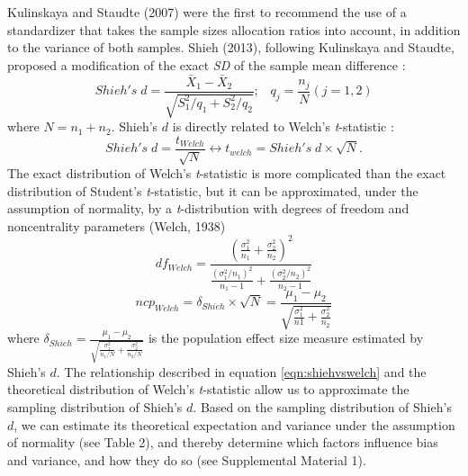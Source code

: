 \documentclass[
  english,
  man,floatsintext]{apa6}
\begin{document}
Kulinskaya and Staudte (2007) were the first to recommend the use of a standardizer that takes the sample sizes allocation ratios into account, in addition to the variance of both samples. Shieh (2013), following Kulinskaya and Staudte, proposed a modification of the exact \emph{SD} of the sample mean difference :
\begin{equation*} 
Shieh's \; d = \frac{\bar{X}_1 - \bar{X}_2}{\sqrt{S_1^2/q_1+S_2^2/q_2}}; \;\;\; q_j=\frac{n_j}{N} (j=1,2)
\label{eqn:Shiehds}
\end{equation*}
where \(N = n_1+n_2\). Shieh's \(d\) is directly related to Welch's \emph{t}-statistic :
\begin{equation} 
Shieh's \; d=\frac{t_{Welch}}{\sqrt{N}}\leftrightarrow t_{welch} = Shieh's \; d \times \sqrt{N}.
\label{eqn:shiehvswelch}
\end{equation}
The exact distribution of Welch's \emph{t}-statistic is more complicated than the exact distribution of Student's \emph{t}-statistic, but it can be approximated, under the assumption of normality, by a \emph{t}-distribution with degrees of freedom and noncentrality parameters (Welch, 1938)
\begin{equation} 
df_{Welch} = \frac{\left(\frac{\sigma^2_1}{n_1}+\frac{\sigma^2_2}{n_2} \right)^2}{\frac{(\sigma^2_1/n_1)^2}{n_1-1}+\frac{(\sigma^2_2/n_2)^2}{n_2-1}}
\label{eqn:welchdf}
\end{equation}
\begin{equation*} 
ncp_{Welch} = \delta_{Shieh} \times \sqrt{N} = \frac{\mu_1-\mu_2}{\sqrt{\frac{\sigma_1^2}{n1}+\frac{\sigma_2^2}{n_2}}}
\label{eqn:welchncp}
\end{equation*}
where \(\delta_{Shieh}=\frac{\mu_1-\mu_2}{\sqrt{\frac{\sigma_1^2}{n_1/N}+\frac{\sigma_2^2}{n_2/N}}}\) is the population effect size measure estimated by Shieh's \(d\). The relationship described in equation \ref{eqn:shiehvswelch} and the theoretical distribution of Welch's \emph{t}-statistic allow us to approximate the sampling distribution of Shieh's \(d\). Based on the sampling distribution of Shieh's \(d\), we can estimate its theoretical expectation and variance under the assumption of normality (see Table 2), and thereby determine which factors influence bias and variance, and how they do so (see Supplemental Material 1).
\end{document}
